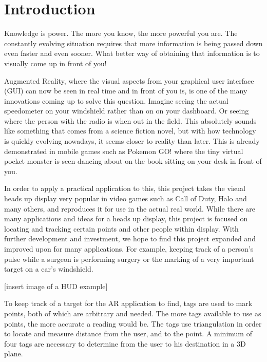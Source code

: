 
\chapter{Introduction} %

\label{Introduction} %


Knowledge is power. The more you know, the more powerful you are. The constantly evolving situation requires that more information is being passed down even faster and even sooner. What better way of obtaining that information is to visually come up in front of you!

Augmented Reality, where the visual aspects from your graphical user interface (GUI) can now be seen in real time and in front of you is, is one of the many innovations coming up to solve this question. Imagine seeing the actual speedometer on your windshield rather than on on your dashboard. Or seeing where the person with the radio is when out in the field. This absolutely sounds like something that comes from a science fiction novel, but with how technology is quickly evolving nowadays, it seems closer to reality than later. This is already demonstrated in mobile games such as Pokemon GO! where the tiny virtual pocket monster is seen dancing about on the book sitting on your desk in front of you.

In order to apply a practical application to this, this project takes the visual heads up display very popular in video games such as Call of Duty, Halo and many others, and reproduces it for use in the actual real world. While there are many applications and ideas for a heads up display, this project is focused on locating and tracking certain points and other people within display. With further development and investment, we hope to find this project expanded and improved upon for many applications. For example, keeping track of a person’s pulse while a surgeon is performing surgery or  the marking of a very important target on a car’s windshield.

[insert image of a HUD example]

To keep track of a target for the AR application to find, tags are used to mark points, both of which are arbitrary and needed. The more tags available to use as points, the more accurate a reading would be. The tags use triangulation in order to locate and measure distance from the user, and to the point. A minimum of four tags are necessary to determine from the user to his destination in a 3D plane.

